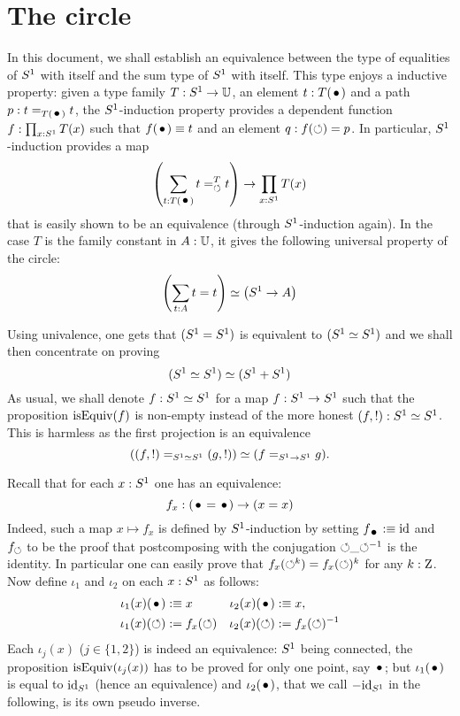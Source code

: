 \documentclass[english,a4]{article}
\def\U{\universe U}%
\def\blank{\_}%
\begin{document}
\section{The circle}
\label{sec:circle-case}%
In this document, we shall establish an equivalence
between the type of equalities of ${S^1}$ with itself and the sum type
of ${S^1}$ with itself. 
This type enjoys a inductive property: given a type family
$T : \Sc \to \U$, an element $t:T(\base)$ and a path
$p:t=_{T(\base)}t$, the ${S^1}$-induction property provides a dependent
function $f : \prod_{x:{S^1}}T(x)$ such that $f(\base) \jdeq t$ and an
element $q: f(\mathord{\circlearrowleft}) = p$. In particular, ${S^1}$-induction provides a
map
\begin{equation}
  \label{eq:2}
  \left(\sum_{t:T(\base)} \pathover t T \Sloop t\right) \to \prod_{x:\Sc}T(x)
\end{equation}
that is easily shown to be an equivalence (through ${S^1}$-induction
again). In the case $T$ is the family constant in $A:\U$, it gives the
following universal property of the circle:
\begin{equation}
  \label{eq:3}
  \left(\sum_{t:A}t=t\right) \simeq \left( {S^1} \to A \right)
\end{equation}

Using univalence, one gets that $({S^1} = {S^1})$ is
equivalent to $({S^1} \simeq {S^1})$ and we shall then concentrate on
proving
\begin{equation}
  ({S^1} \simeq {S^1}) \simeq ({S^1}+{S^1})
\end{equation}
As usual, we shall denote $f:{S^1}\simeq{S^1}$ for a map $f:{S^1}\to {S^1} $
such that the proposition $\mathrm{isEquiv}(f)$ is non-empty instead of the more
honest $(f,!):{S^1} \simeq {S^1}$. 
This is harmless as the first projection is an equivalence
\begin{equation}
  ((f,!) =_{{S^1} \simeq {S^1}} (g,!)) \simeq (f=_{{S^1} \to {S^1}}g).
\end{equation}

Recall that for each $x:{S^1}$ one has an equivalence:
\begin{equation}
  \label{eq:8}
  f_x : (\base = \base) \to (x=x)
\end{equation}
Indeed, such a map $x\mapsto f_x$ is defined by ${S^1}$-induction by
setting $f_{\base} \defequi \id$ and $f_{\mathord{\circlearrowleft}}$ to be the proof that
postcomposing with the conjugation $\Sloop \blank \inv\Sloop$ is the
identity. In particular one can easily prove that
$f_x(\mathord{\circlearrowleft}^k) = f_x(\mathord{\circlearrowleft})^k$ for any $k:\mathrm{Z}$. Now define $\iota_1$
and $\iota_2$ on each $x:{S^1}$ as follows:
\begin{align*}
  \iota_1(x) (\base) &\defequi x & \iota_2(x) (\base) &\defequi x,
  \\
  \iota_1(x)(\Sloop) &\defis f_x(\Sloop) &  \iota_2(x)(\Sloop) &\defis f_x(\Sloop)^{-1}
\end{align*}
Each $\iota_j(x)$ ($j\in\{1,2\}$) is indeed an equivalence: ${S^1}$
being connected, the proposition $\mathrm{isEquiv}(\iota_j(x))$ has to be proved
for only one point, say $\base$; but $\iota_1(\base)$ is equal to
$\mathord{\mathrm{id}}_{S^1}$ (hence an equivalence) and $\iota_2(\base)$, that we call
$-\mathord{\mathrm{id}}_{S^1}$ in the following, is its own pseudo inverse.
\end{document}
